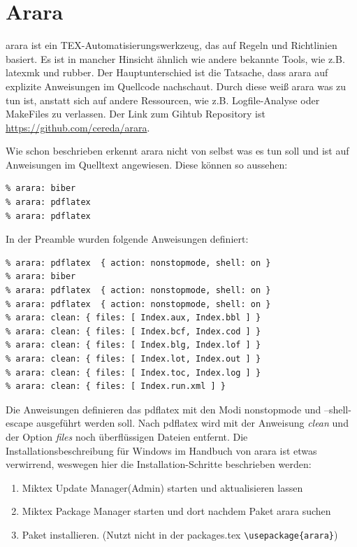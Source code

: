 \section{Arara}
arara ist ein TEX-Automatisierungswerkzeug, das auf Regeln und Richtlinien basiert. Es ist in mancher Hinsicht ähnlich wie andere bekannte Tools, wie z.B. latexmk\autocite{latexmk} und rubber\autocite{rubber}. Der Hauptunterschied ist die Tatsache, dass arara auf explizite Anweisungen im Quellcode nachschaut. Durch diese weiß arara was zu tun ist, anstatt sich auf andere Ressourcen, wie z.B. Logfile-Analyse oder MakeFiles zu verlassen. Der Link zum Gihtub Repository ist \url{https://github.com/cereda/arara}. 

Wie schon beschrieben erkennt arara nicht von selbst was es tun soll und ist auf Anweisungen im Quelltext angewiesen. Diese können so aussehen:
\begin{lstlisting}[style=LaTeX]
% arara: pdflatex
% arara: biber
% arara: pdflatex
% arara: pdflatex
\end{lstlisting}

In der Preamble wurden folgende Anweisungen definiert:
\begin{lstlisting}[style=LaTeX]
% arara: pdflatex  { action: nonstopmode, shell: on }
% arara: pdflatex  { action: nonstopmode, shell: on }
% arara: biber
% arara: pdflatex  { action: nonstopmode, shell: on }
% arara: pdflatex  { action: nonstopmode, shell: on }
% arara: clean: { files: [ Index.aux, Index.bbl ] }
% arara: clean: { files: [ Index.bcf, Index.cod ] } 
% arara: clean: { files: [ Index.blg, Index.lof ] }
% arara: clean: { files: [ Index.lot, Index.out ] } 
% arara: clean: { files: [ Index.toc, Index.log ] } 
% arara: clean: { files: [ Index.run.xml ] }
\end{lstlisting}

Die Anweisungen definieren das pdflatex mit den Modi nonstopmode und --shell-escape ausgeführt werden soll. Nach pdflatex wird mit der Anweisung \emph{clean} und der Option \emph{files} noch überflüssigen Dateien entfernt. 
Die Installationsbeschreibung für Windows im Handbuch von arara ist etwas verwirrend, weswegen hier die Installation-Schritte beschrieben werden:
\begin{enumerate}
\item Miktex Update Manager(Admin) starten und aktualisieren lassen
\item Miktex Package Manager starten und dort nachdem Paket arara suchen
\item Paket installieren. (Nutzt nicht in der packages.tex \verb|\usepackage{arara}|)	
\end{enumerate}

